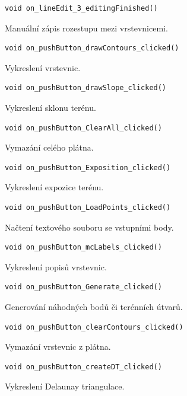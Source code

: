\documentclass[a4paper, 12pt, oneside, titlepage]{article} %
\begin{document}
\begin{verbatim}
void on_lineEdit_3_editingFinished()
\end{verbatim}
Manuální zápis rozestupu mezi vrstevnicemi.\\

\begin{verbatim}
void on_pushButton_drawContours_clicked()
\end{verbatim}
Vykreslení vrstevnic.\\

\begin{verbatim}
void on_pushButton_drawSlope_clicked()
\end{verbatim}
Vykreslení sklonu terénu.\\

\begin{verbatim}
void on_pushButton_ClearAll_clicked()
\end{verbatim}
Vymazání celého plátna.\\

\begin{verbatim}
void on_pushButton_Exposition_clicked()
\end{verbatim}
Vykreslení expozice terénu.\\

\begin{verbatim}
void on_pushButton_LoadPoints_clicked()
\end{verbatim}
Načtení textového souboru se vstupními body.\\

\begin{verbatim}
void on_pushButton_mcLabels_clicked()
\end{verbatim}
Vykreslení popisů vrstevnic.\\

\begin{verbatim}
void on_pushButton_Generate_clicked()
\end{verbatim}
Generování náhodných bodů či terénních útvarů.\\

\begin{verbatim}
void on_pushButton_clearContours_clicked()
\end{verbatim}
Vymazání vrstevnic z plátna.\\

\begin{verbatim}
void on_pushButton_createDT_clicked()
\end{verbatim}
Vykreslení Delaunay triangulace.\\
\end{document}
